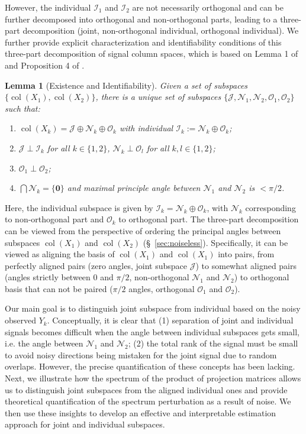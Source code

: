 \documentclass{amsart}
\DeclareMathOperator*{\col}{col}
\newcommand{\Ncal}{\mathcal{N}}
\newcommand{\Ocal}{\mathcal{O}}
\newcommand{\Jcal}{\mathcal{J}}
\newcommand{\Ical}{\mathcal{I}}
\newtheorem{lemma}[theorem]{Lemma}
\begin{document}
However, the individual $\Ical_1$ and $\Ical_2$ are not necessarily orthogonal and can be further decomposed into orthogonal and non-orthogonal parts, leading to a three-part decomposition (joint, non-orthogonal individual, orthogonal individual). We further provide explicit characterization and identifiability conditions of this three-part decomposition of signal column spaces, which is based on Lemma 1 of \citet{feng2018angle} and Proposition 4 of \citet{gaynanova2019structural}.


\begin{lemma}[Existence and Identifiability] 
\label{lemma:identifiability}
Given a set of subspaces $\{\col(X_1), \col(X_2)\}$, there is a unique set of subspaces $\{\Jcal, \Ncal_1, \Ncal_2, \Ocal_1, \Ocal_2\}$ such that:
\begin{enumerate}
    \item $\col(X_k) = \Jcal \oplus \Ncal_k \oplus\Ocal_k$ with individual $\Ical_k := \Ncal_k \oplus \Ocal_k$;
    \item $\Jcal \perp \Ical_k$ { for all $k\in\{1, 2\}$}, $\Ncal_k \perp \Ocal_l$ for { all $k, l \in \{1, 2\}$};
    \item $\Ocal_1 \perp \Ocal_2$;
    \item $\bigcap \Ncal_k = \{\mathbf{0}\}$ and maximal principle angle between $\Ncal_1$ and $\Ncal_2$ is $<\pi/2$.
\end{enumerate}
\end{lemma}

Here, the individual subspace is given by $\Ical_k = \Ncal_k \oplus \Ocal_k$, with $\Ncal_k$ corresponding to non-orthogonal part and $\Ocal_k$ to orthogonal part. 
The three-part decomposition can be viewed from the perspective of ordering the principal angles between subspaces $\col(X_1)$ and $\col(X_2)$ (\S~\ref{sec:noiseless}). Specifically, it can be viewed as aligning the basis of $\col(X_1)$ and $\col(X_1)$ into pairs, from perfectly aligned pairs (zero angles, joint subspace $\Jcal$) to somewhat aligned pairs (angles strictly between 0 and $\pi/2$, non-orthogonal $\Ncal_1$ and $
\Ncal_2$) to orthogonal basis that can not be paired ($\pi/2$ angles, orthogonal $\Ocal_1$ and $\Ocal_2$). 


Our main goal is to distinguish joint subspace from individual based on the noisy observed $Y_k$. Conceptually, it is clear that (1) separation of joint and individual
signals becomes difficult when the angle between individual subspaces gets small, i.e. the angle between $\mathcal{N}_1$ and $\mathcal{N}_2$; (2) the total
rank of the signal must be small to avoid noisy directions being mistaken for the joint signal due to
random overlaps. However, the precise quantification of these concepts has been lacking. Next, we illustrate how the spectrum of the product of projection matrices allows us to distinguish joint subspaces from the aligned individual ones and provide theoretical quantification of the spectrum perturbation as a result of noise. We then use these insights to develop an effective and interpretable estimation approach for joint and individual subspaces.
\end{document}
